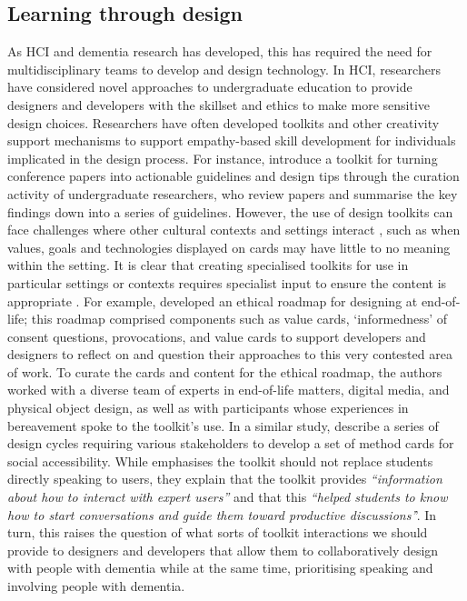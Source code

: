 \subsection{Learning through design}
\label{Dementia-Design}
As HCI and dementia research has developed, this has required the need for multidisciplinary teams to develop and design technology. In HCI, researchers have considered novel approaches to undergraduate education to provide designers and developers with the skillset and ethics to make more sensitive design choices. Researchers have often developed toolkits and other creativity support mechanisms to support empathy-based skill development for individuals implicated in the design process. For instance, \cite{chen2020interaction} introduce a toolkit for turning conference papers into actionable guidelines and design tips through the curation activity of undergraduate researchers, who review papers and summarise the key findings down into a series of guidelines. However, the use of design toolkits can face challenges where other cultural contexts and settings interact \citep{peters2020toolkits}, such as when values, goals and technologies displayed on cards may have little to no meaning within the setting.   
It is clear that creating specialised toolkits for use in particular settings or contexts requires specialist input to ensure the content is appropriate \citep{alshehri2020scenario,meissner2018schnittmuster}. For example, \cite{craig2021development} developed an ethical roadmap for designing at end-of-life; this roadmap comprised components such as value cards, ‘informedness’ of consent questions, provocations, and value cards to support developers and designers to reflect on and question their approaches to this very contested area of work. To curate the cards and content for the ethical roadmap, the authors worked with a diverse team of experts in end-of-life matters, digital media, and physical object design, as well as with participants whose experiences in bereavement spoke to the toolkit’s use. In a similar study, \cite{shinohara2020design} describe a series of design cycles requiring various stakeholders to develop a set of method cards for social accessibility. While \cite{shinohara2020design} emphasises the toolkit should not replace students directly speaking to users, they explain that the toolkit provides \textit{``information about how to interact with expert users''} and that this \textit{``helped students to know how to start conversations and guide them toward productive discussions'}'. In turn, this raises the question of what sorts of toolkit interactions we should provide to designers and developers that allow them to collaboratively design with people with dementia while at the same time, prioritising speaking and involving people with dementia.


